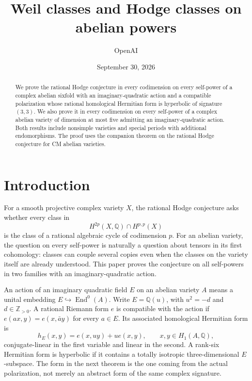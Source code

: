 \documentclass[11pt]{article}
\newcommand{\Q}{\mathbb Q}
\newcommand{\Z}{\mathbb Z}
\numberwithin{equation}{section}
\begin{document}
\title{Weil classes and Hodge classes on abelian powers}
\author{OpenAI}
\date{September 30, 2026}
\maketitle

\begin{abstract}
We prove the rational Hodge conjecture in every codimension on every
self-power of a complex abelian sixfold with an imaginary-quadratic
action and a compatible polarization whose rational homological Hermitian
form is hyperbolic of signature \((3,3)\). We also prove it in every
codimension on every self-power of a complex abelian variety of dimension
at most five admitting an imaginary-quadratic action. Both results include
nonsimple varieties and special periods with additional endomorphisms.
The proof uses the companion theorem on the rational Hodge conjecture for
CM abelian varieties.
\end{abstract}

\begingroup
\small
\tableofcontents
\endgroup
\clearpage

\section{Introduction}
\label{p3:sec:introduction}

For a smooth projective complex variety \(X\), the rational Hodge
conjecture asks whether every class in
\[
 H^{2p}(X,\Q)\cap H^{p,p}(X)
\]
is the class of a rational algebraic cycle of codimension \(p\).
For an abelian variety, the question on every self-power is naturally a
question about tensors in its first cohomology: classes can couple several
copies even when the classes on the variety itself are already understood.
This paper proves the conjecture on all self-powers in two families with an
imaginary-quadratic action.

An action of an imaginary quadratic field \(E\) on an abelian variety
\(A\) means a unital embedding \(E\hookrightarrow\operatorname{End}^0(A)\).
Write \(E=\Q(u)\), with \(u^2=-d\) and \(d\in\Z_{>0}\). A rational Riemann form
\(e\) is compatible with the action if
\(e(ax,y)=e(x,\bar a y)\) for every \(a\in E\). Its associated homological
Hermitian form is
\[
 h_E(x,y)=e(x,uy)+u e(x,y),\qquad x,y\in H_1(A,\Q),
\]
conjugate-linear in the first variable and linear in the second. A rank-six
Hermitian form is hyperbolic if it contains a totally isotropic
three-dimensional \(E\)-subspace. The form in the next theorem is the one
coming from the actual polarization, not merely an abstract form of the
same complex signature.
\end{document}
